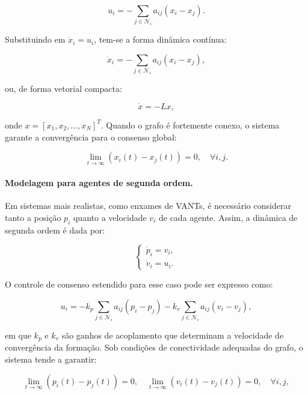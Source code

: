 \begin{equation}
u_i = -\sum_{j \in \mathcal{N}_i} a_{ij} (x_i - x_j).
\end{equation}

Substituindo em \(\dot{x}_i = u_i\), tem-se a forma dinâmica contínua:

\begin{equation}
\dot{x}_i = -\sum_{j \in \mathcal{N}_i} a_{ij} (x_i - x_j),
\end{equation}

ou, de forma vetorial compacta:

\begin{equation}
\dot{x} = -Lx,
\end{equation}

onde \(x = [x_1, x_2, \dots, x_N]^T\). Quando o grafo é fortemente conexo, o sistema garante a convergência para o consenso global:

\begin{equation}
\lim_{t \to \infty} (x_i(t) - x_j(t)) = 0, \quad \forall i,j.
\end{equation}

\paragraph{Modelagem para agentes de segunda ordem.}
Em sistemas mais realistas, como enxames de VANTs, é necessário considerar tanto a posição \(p_i\) quanto a velocidade \(v_i\) de cada agente. Assim, a dinâmica de segunda ordem é dada por:

\begin{equation}
\begin{cases}
\dot{p}_i = v_i,\\[4pt]
\dot{v}_i = u_i.
\end{cases}
\end{equation}

O controle de consenso estendido para esse caso pode ser expresso como:

\begin{equation}
u_i = -k_p \sum_{j \in \mathcal{N}_i} a_{ij}(p_i - p_j) - k_v \sum_{j \in \mathcal{N}_i} a_{ij}(v_i - v_j),
\end{equation}

em que \(k_p\) e \(k_v\) são ganhos de acoplamento que determinam a velocidade de convergência da formação. Sob condições de conectividade adequadas do grafo, o sistema tende a garantir:

\begin{equation}
\lim_{t \to \infty} (p_i(t) - p_j(t)) = 0, \quad \lim_{t \to \infty} (v_i(t) - v_j(t)) = 0, \quad \forall i,j,
\end{equation}

